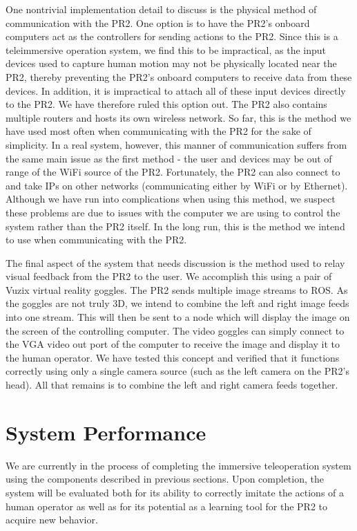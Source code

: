 \documentclass{sig-alternate}
\begin{document}
One nontrivial implementation detail to discuss is the physical method of
communication with the PR2. One option is to have the PR2's onboard computers
act as the controllers for sending actions to the PR2. Since this is a teleimmersive operation system, we find
this to be impractical, as the input devices used to capture human motion may not be physically located
near the PR2, thereby preventing the PR2's onboard computers to receive data from these devices. 
In addition, it is impractical to attach all of these input devices 
directly to the PR2. We have therefore ruled this option out. The PR2 also contains multiple routers and hosts its
own wireless network. So far, this is the method we have used most often when
communicating with the PR2 for the sake of simplicity. In a real system, however,
this manner of communication suffers from the same main issue as the first method - the user and devices
may be out of range of the WiFi source of the PR2. Fortunately,
the PR2 can also connect to and take IPs on other networks (communicating either by WiFi or by
Ethernet). Although we have run into complications when using this method, we
suspect these problems are due to issues with the computer we are using to control the
system rather than the PR2 itself.
In the long run, this is the method we intend to use when communicating with the PR2.

The final aspect of the system that needs discussion is the method used to relay visual feedback from the PR2 to the user.
We accomplish this using a
pair of  Vuzix virtual reality goggles. The PR2 sends multiple image 
streams to ROS. As the goggles are not truly 3D, we intend to combine the left 
and right image feeds into one stream. This will then be sent to a node which will display the image
on the screen of the controlling computer. The video goggles can simply connect
to the VGA video out port of the computer to
receive the image and display it to the human operator. We have tested this concept and
verified that it functions correctly using only a single camera source (such as
the left camera on the PR2's head). All that remains is to combine the left and right camera
feeds together.

\section{System Performance}
We are currently in the process of completing the immersive 
teleoperation system using the components described in previous sections. Upon
completion, the system will be evaluated both for its ability to correctly
imitate the actions of a human operator as well as for its potential 
as a learning tool for the PR2 to acquire new behavior.\\
\end{document}
